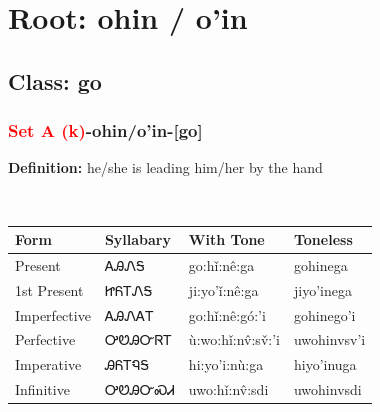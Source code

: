 \needspace{4in}
\section*{Root: ohin / o'in}
\nopagebreak
{}
\needspace{3in}
\subsection*{Class: go}
\nopagebreak
\needspace{2in}
\subsubsection*{\textcolor{Red}{Set A (k)}{-}\textbf{ohin/o'in}{-}[go]}
\nopagebreak
\textbf{Definition: } he/she is leading him/her by the hand
\\[0.5em]
\begin{tabularx}{\textwidth}{l X X X}%
\toprule%
\textbf{Form}&\textbf{Syllabary}&\textbf{With Tone}&\textbf{Toneless}\\%
\midrule%
Present&ᎪᎯᏁᎦ&go:hǐ:nê:ga&gohinega\\%
1st Present&ᏥᏲᎢᏁᎦ&ji:yo’ǐ:nê:ga&jiyo’inega\\%
Imperfective&ᎪᎯᏁᎪᎢ&go:hǐ:nê:gó:’i&gohinego’i\\%
Perfective&ᎤᏬᎯᏅᏒᎢ&ù:wo:hǐ:nv̂:sv̌:’i&uwohinvsv’i\\%
Imperative&ᎯᏲᎢᏄᎦ&hi:yo’i:nù:ga&hiyo’inuga\\%
Infinitive&ᎤᏬᎯᏅᏍᏗ&uwo:hǐ:nv̂:sdi&uwohinvsdi\\%
\bottomrule%
\end{tabularx}
\\[1em]
